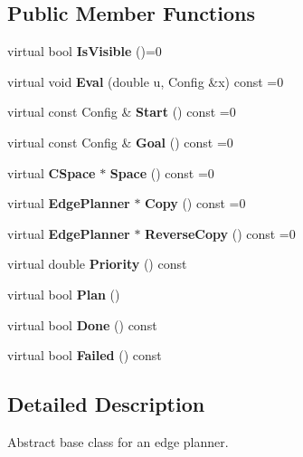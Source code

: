 \subsection*{Public Member Functions}
\begin{DoxyCompactItemize}
\item 
virtual bool {\bfseries Is\+Visible} ()=0\label{classEdgePlanner_a36811a10f49a2b007cae12af1bf39a4d}

\item 
virtual void {\bfseries Eval} (double u, Config \&x) const =0\label{classEdgePlanner_ad866977a4bb25c1453578b7796e99866}

\item 
virtual const Config \& {\bfseries Start} () const =0\label{classEdgePlanner_a8aa4b92bababf31603d57dddfed13737}

\item 
virtual const Config \& {\bfseries Goal} () const =0\label{classEdgePlanner_ae49f00e96cc3fdd2720d4d8df1141130}

\item 
virtual {\bf C\+Space} $\ast$ {\bfseries Space} () const =0\label{classEdgePlanner_a023245383ad18f2a7c61ea6f7ceb8876}

\item 
virtual {\bf Edge\+Planner} $\ast$ {\bfseries Copy} () const =0\label{classEdgePlanner_afe4085b769bffa8cb9a926ffb99d60f4}

\item 
virtual {\bf Edge\+Planner} $\ast$ {\bfseries Reverse\+Copy} () const =0\label{classEdgePlanner_ab105b939eb2920016c5d2e674b77cd58}

\item 
virtual double {\bfseries Priority} () const \label{classEdgePlanner_a77773f4d61e2c7f6a17ef03642707e07}

\item 
virtual bool {\bfseries Plan} ()\label{classEdgePlanner_a5d84b9e80743bf3a3006af65ce75edee}

\item 
virtual bool {\bfseries Done} () const \label{classEdgePlanner_a9e9d54be1a275f31a930457e57e4cbcc}

\item 
virtual bool {\bfseries Failed} () const \label{classEdgePlanner_a0779bdf39860d9819162172279b7bb83}

\end{DoxyCompactItemize}


\subsection{Detailed Description}
Abstract base class for an edge planner. 

